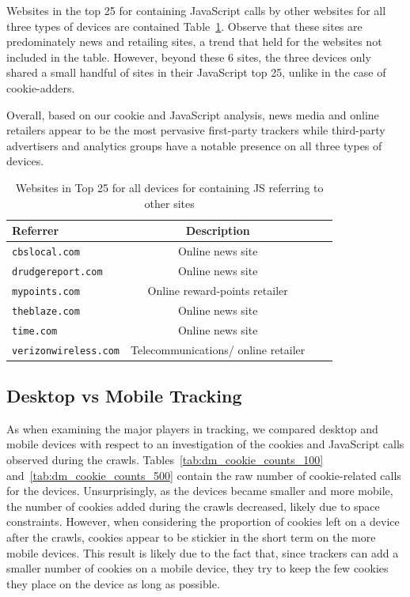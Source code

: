 \documentclass{acm_proc_article-sp}
\begin{document}
Websites in the top 25 for containing JavaScript calls by other websites for all three types of devices are contained Table~\ref{tab:major_js}. Observe that these sites are predominately news and retailing sites, a trend that held for the websites not included in the table. However, beyond these 6 sites, the three devices only shared a small handful of sites in their JavaScript top 25, unlike in the case of cookie-adders.

Overall, based on our cookie and JavaScript analysis, news media and online retailers appear to be the most pervasive first-party trackers while third-party advertisers and analytics groups have a notable presence on all three types of devices.

\begin{table}[h]
  \centering
  \caption{Websites in Top 25 for all devices for containing JS referring to other sites}
    \begin{tabular}{|c|c|c|c|}
    \hline
     \multicolumn{1}{|l|}{\textbf{Referrer}} & \textbf{Description}    \\ \hline
     \multicolumn{1}{|l|}{\texttt{cbslocal.com}} & Online news site   \\
    \multicolumn{1}{|l|}{\texttt{drudgereport.com}} & Online news site   \\
     \multicolumn{1}{|l|}{\texttt{mypoints.com}} & Online reward-points retailer   \\
      \multicolumn{1}{|l|}{\texttt{theblaze.com}} & Online news site   \\
       \multicolumn{1}{|l|}{\texttt{time.com}} & Online news site   \\
        \multicolumn{1}{|l|}{\texttt{verizonwireless.com}} & Telecommunications/ online retailer   \\ \hline
    \end{tabular}%
  \label{tab:major_js}%
\end{table}%

\subsection{Desktop vs Mobile Tracking}
\label{sec:desktop_vs_mobile}

As when examining the major players in tracking, we compared desktop and mobile devices with respect to an investigation of the cookies and JavaScript calls observed during the crawls. Tables~\ref{tab:dm_cookie_counts_100} and~\ref{tab:dm_cookie_counts_500} contain the raw number of cookie-related calls for the devices. Unsurprisingly, as the devices became smaller and more mobile, the number of cookies added during the crawls decreased, likely due to space constraints. However, when considering the proportion of cookies left on a device after the crawls, cookies appear to be stickier in the short term on the more mobile devices. This result is likely due to the fact that, since trackers can add a smaller number of cookies on a mobile device, they try to keep the few cookies they place on the device as long as possible.
\end{document}
